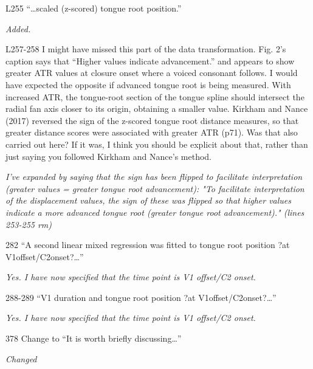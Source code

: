 \documentclass[]{article}
\begin{document}
L255 ``\ldots{}scaled (z-scored) tongue root position.''

\begin{adjustwidth}{1cm}{} \textit{
Added.
} \end{adjustwidth}

L257-258 I might have missed this part of the data transformation. Fig.
2's caption says that ``Higher values indicate advancement.'' and
appears to show greater ATR values at closure onset where a voiced
consonant follows. I would have expected the opposite if advanced tongue
root is being measured. With increased ATR, the tongue-root section of
the tongue spline should intersect the radial fan axis closer to its
origin, obtaining a smaller value. Kirkham and Nance (2017) reversed the
sign of the z-scored tongue root distance measures, so that greater
distance scores were associated with greater ATR (p71). Was that also
carried out here? If it was, I think you should be explicit about that,
rather than just saying you followed Kirkham and Nance's method.

\begin{adjustwidth}{1cm}{} \textit{
I've expanded by saying that the sign has been flipped to facilitate interpretation (greater values = greater tongue root advancement): "To facilitate interpretation of the displacement values, the sign of these was flipped so that higher values indicate a more advanced tongue root (greater tongue root advancement)." (lines 253-255 rm)
} \end{adjustwidth}

282 ``A second linear mixed regression was fitted to tongue root
position ?at V1offset/C2onset?\ldots{}''

\begin{adjustwidth}{1cm}{} \textit{
Yes. I have now specified that the time point is V1 offset/C2 onset.
} \end{adjustwidth}

288-289 ``V1 duration and tongue root position ?at
V1offset/C2onset?\ldots{}''

\begin{adjustwidth}{1cm}{} \textit{
Yes. I have now specified that the time point is V1 offset/C2 onset.
} \end{adjustwidth}

378 Change to ``It is worth briefly discussing\ldots{}''

\begin{adjustwidth}{1cm}{} \textit{
Changed
} \end{adjustwidth}
\end{document}

